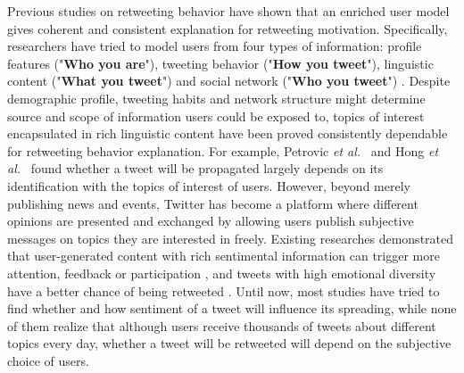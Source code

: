 \documentclass{acm_proc_article-sp}
\begin{document}
Previous studies on retweeting behavior have shown that an enriched user model gives coherent and consistent explanation for retweeting motivation\cite{Abel:2011AUM,conf/icwsm/MacskassyM11,conf/wsdm/FengW13}. 
Specifically, researchers have tried to model users from four types of information:
profile features ("\textbf{Who you are}"), tweeting behavior ("\textbf{How you tweet}"), linguistic content ("\textbf{What you tweet}") and social network ("\textbf{Who you tweet}") \cite{Pennacchiotti:icwsm11}. 
Despite demographic profile, tweeting habits and network structure might determine source and scope of information users could be exposed to, topics of interest encapsulated in rich linguistic content have been proved consistently dependable for retweeting behavior explanation. 
For example, Petrovic \emph{et al.}~\cite{Osborne_Lavrenko_2011} and Hong \emph{et al.}~\cite{ericmedvet:hong2011} found whether a tweet will be propagated largely depends on its identification with the topics of interest of users. 
However, beyond merely publishing news and events, Twitter has become a platform where different opinions are presented and exchanged by allowing users publish subjective messages on topics they are interested in freely. 
Existing researches demonstrated that user-generated content with rich sentimental information can trigger more attention, feedback or participation \cite{DBLP:conf/hicss/StieglitzD12}, and tweets with high emotional diversity have a better chance of being retweeted \cite{conf/icwsm/PfitznerGS12}.
Until now, most studies have tried to find whether and how sentiment of a tweet will influence its spreading, while none of them realize that although users receive thousands of tweets about different topics every day, whether a tweet will be retweeted will depend on the subjective choice of users. 
\end{document}
